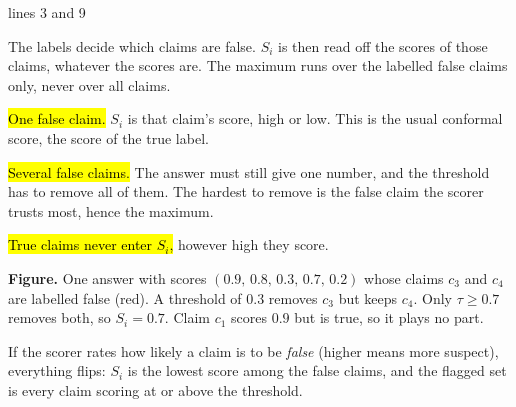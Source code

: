 \documentclass[10pt,a4paper]{article}
\newcommand{\cav}[3]{\par\vspace{7pt}{\sffamily\bfseries\color{secblue}#1\quad #2}\hfill{\scriptsize\textcolor{ourfr}{#3}}\par\vspace{1pt}{\color{secblue!35}\hrule height 0.5pt}\vspace{4pt}}
\newenvironment{blist}{\begin{list}{\textcolor{recfr}{\textbullet}}{\setlength{\leftmargin}{1.2em}\setlength{\labelwidth}{0.8em}\setlength{\labelsep}{0.4em}%
  \setlength{\itemsep}{3pt}\setlength{\parsep}{0pt}\setlength{\topsep}{2pt}\setlength{\partopsep}{0pt}}}{\end{list}}
\begin{document}
\vspace{2pt}
\begin{minipage}[t]{0.492\linewidth}
\small
\cav{1}{$S_i$ looks only at the false claims}{lines 3 and 9}
The labels decide which claims are false. $S_i$ is then read off the scores of those claims, whatever the scores are. The maximum runs over the labelled false claims only, never over all claims.
\begin{blist}
\item \hl{One false claim.} $S_i$ is that claim's score, high or low. This is the usual conformal score, the score of the true label.
\item \hl{Several false claims.} The answer must still give one number, and the threshold has to remove all of them. The hardest to remove is the false claim the scorer trusts most, hence the maximum.
\item \hl{True claims never enter $S_i$,} however high they score.
\end{blist}

\vspace{5pt}
\begin{center}
\end{center}
\vspace{-6pt}
{\footnotesize\textbf{Figure.} One answer with scores $(0.9,\,0.8,\,0.3,\,0.7,\,0.2)$ whose claims $c_3$ and $c_4$ are labelled false (red). A threshold of $0.3$ removes $c_3$ but keeps $c_4$. Only $\tau\ge0.7$ removes both, so $S_i=0.7$. Claim $c_1$ scores $0.9$ but is true, so it plays no part.\par}

\vspace{6pt}
\begin{oursbox}
If the scorer rates how likely a claim is to be \emph{false} (higher means more suspect), everything flips: $S_i$ is the lowest score among the false claims, and the flagged set is every claim scoring at or above the threshold.
\end{oursbox}
\end{minipage}\hfill
\end{document}
